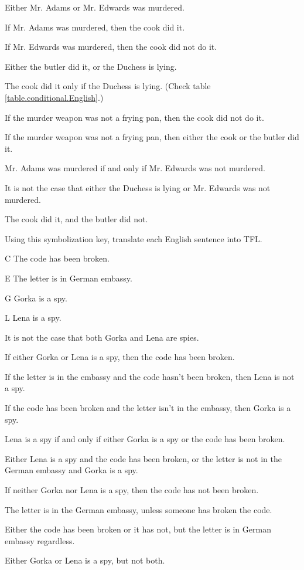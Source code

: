 \begin{earg}
\item Either Mr. Adams or Mr. Edwards was murdered.
\item If Mr. Adams was murdered, then the cook did it.
\item If Mr. Edwards was murdered, then the cook did not do it.
\item Either the butler did it, or the Duchess is lying.
\item The cook did it only if the Duchess is lying. (Check table \ref{table.conditional.English}.)
\item If the murder weapon was not a frying pan, then the cook did not do it.
\item If the murder weapon was not a frying pan, then either the cook or the butler did it.
\item Mr. Adams was murdered if and only if Mr. Edwards was not murdered.
\item It is not the case that either the Duchess is lying or Mr. Edwards was not murdered.
\item The cook did it, and the butler did not.
\end{earg}


\problempart
\label{pr.spies}
Using this symbolization key, translate each English sentence into TFL.
\begin{ekey}
\item[C] The code has been broken.
\item[E] The letter is in German embassy.
\item[G] Gorka is a spy.
\item[L] Lena is a spy.
\end{ekey}
\begin{earg}
\item It is not the case that both Gorka and Lena are spies.
\item If either Gorka or Lena is a spy, then the code has been broken.

\item If the letter is in the embassy and the code hasn't been broken, then Lena is not a spy.
\item If the code has been broken and the letter isn't in the embassy, then Gorka is a spy.
\item Lena is a spy if and only if either Gorka is a spy or the code has been broken.
\item Either Lena is a spy and the code has been broken, or the letter is not in the German embassy and Gorka is a spy. 

\item If neither Gorka nor Lena is a spy, then the code has not been broken.
\item The letter is in the German embassy, unless someone has broken the code.
\item Either the code has been broken or it has not, but the letter is in German embassy regardless.
\item Either Gorka or Lena is a spy, but not both.
\end{earg}



